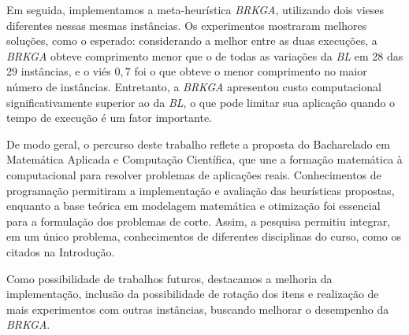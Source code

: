 \documentclass{article}
\begin{document}
Em seguida, implementamos a meta-heurística {\it BRKGA}, utilizando dois vieses diferentes nessas mesmas instâncias. Os experimentos mostraram melhores soluções, como o esperado: considerando a melhor entre as duas execuções, a {\it BRKGA} obteve comprimento menor que o de todas as variações da {\it BL} em 28 das 29 instâncias, e o viés $0,7$ foi o que obteve o menor comprimento no maior número de instâncias. Entretanto, a {\it BRKGA} apresentou custo computacional significativamente superior ao da {\it BL}, o que pode limitar sua aplicação quando o tempo de execução é um fator importante.

De modo geral, o percurso deste trabalho reflete a proposta do Bacharelado em Matemática Aplicada e Computação Científica, que une a formação matemática à computacional para resolver problemas de aplicações reais. Conhecimentos de programação permitiram a implementação e avaliação das heurísticas propostas, enquanto a base teórica em modelagem matemática e otimização foi essencial para a formulação dos problemas de corte. Assim, a pesquisa permitiu integrar, em um único problema, conhecimentos de diferentes disciplinas do curso, como os citados na Introdução.

Como possibilidade de trabalhos futuros, destacamos a melhoria da implementação, inclusão da possibilidade de rotação dos itens e realização de mais experimentos com outras instâncias, buscando melhorar o desempenho da {\it BRKGA}.


\printbibliography
\end{document}
